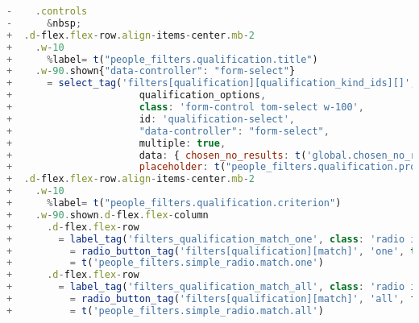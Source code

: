 \begin{lstlisting}[language=JavaScript]
-    .controls
-      &nbsp;
+  .d-flex.flex-row.align-items-center.mb-2
+    .w-10
+      %label= t("people_filters.qualification.title")
+    .w-90.shown{"data-controller": "form-select"}
+      = select_tag('filters[qualification][qualification_kind_ids][]',
+                      qualification_options,
+                      class: 'form-control tom-select w-100',
+                      id: 'qualification-select',
+                      "data-controller": "form-select",
+                      multiple: true,
+                      data: { chosen_no_results: t('global.chosen_no_results'),
+                      placeholder: t("people_filters.qualification.prompt_qualification_placeholder") } )
+  .d-flex.flex-row.align-items-center.mb-2
+    .w-10
+      %label= t("people_filters.qualification.criterion")
+    .w-90.shown.d-flex.flex-column
+      .d-flex.flex-row
+        = label_tag('filters_qualification_match_one', class: 'radio inline') do
+          = radio_button_tag('filters[qualification][match]', 'one', true)
+          = t('people_filters.simple_radio.match.one')
+      .d-flex.flex-row
+        = label_tag('filters_qualification_match_all', class: 'radio inline') do
+          = radio_button_tag('filters[qualification][match]', 'all', filter_args[:match] == 'all', %w(not_active none only_expired).include?(filter_args[:validity]) ? { disabled: true } : {})
+          = t('people_filters.simple_radio.match.all')
\end{lstlisting}

